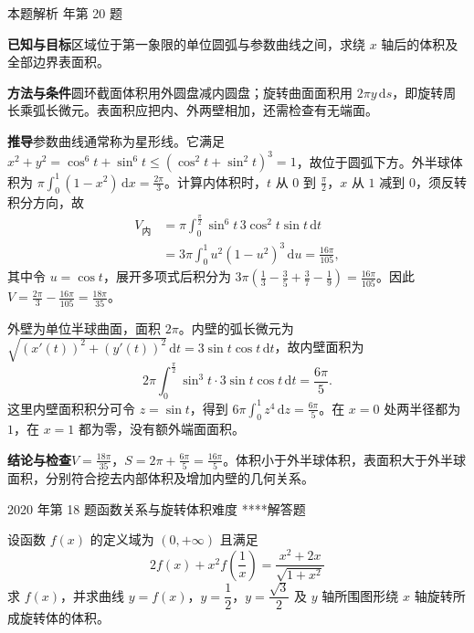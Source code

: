\documentclass[UTF8,zihao=-4,fontset=fandol]{ctexart}
\newcounter{BankQuestion}
\newcommand{\QuestionPage}[7]{%
  \stepcounter{BankQuestion}%
  \par\noindent\begin{minipage}{\linewidth}
  \raggedright
  {\small\textcolor{black!60}{#3\quad #5\quad 难度 #7}\hfill\textcolor{accent}{#2}}\par\smallskip}
\newcommand{\QuestionEnd}{\end{minipage}\par\medskip}
\newcommand{\QuestionPage}[7]{%
  \clearpage
  \stepcounter{BankQuestion}%
  {\small\textcolor{accent}{#1\hfill #2}}\par\medskip
  {\small\textcolor{black!60}{#3\quad #5\quad 难度 #7\hfill \arabic{BankQuestion} / 234}}\par\vspace{9bp}}
\newcommand{\QuestionEnd}{}
\newenvironment{QuestionSolution}[1]{%
  \clearpage
  {\small\textcolor{black!60}{本题解析\quad #1}}\par\medskip
}{\par\clearpage}
\begin{document}
\begin{QuestionSolution}{2016 年第 20 题}
\textbf{已知与目标}\quad 区域位于第一象限的单位圆弧与参数曲线之间，求绕 \(x\) 轴后的体积及全部边界表面积。

\textbf{方法与条件}\quad 圆环截面体积用外圆盘减内圆盘；旋转曲面面积用 \(2\pi y\,\mathrm{d}s\)，即旋转周长乘弧长微元。表面积应把内、外两壁相加，还需检查有无端面。

\textbf{推导}\quad 参数曲线通常称为星形线。它满足 \(x^2+y^2=\cos^6t+\sin^6t\le(\cos^2t+\sin^2t)^3=1\)，故位于圆弧下方。外半球体积为 \(\pi\int_0^1(1-x^2)\,\mathrm{d}x=\frac{2\pi}{3}\)。计算内体积时，\(t\) 从 \(0\) 到 \(\frac{\pi}{2}\)，\(x\) 从 \(1\) 减到 \(0\)，须反转积分方向，故
\[
\begin{aligned}
V_{\text{内}}
&=\pi\int_0^{\frac{\pi}{2}}\sin^6 t\,3\cos^2t\sin t\,\mathrm{d}t\\
&=3\pi\int_0^1 u^2(1-u^2)^3\,\mathrm{d}u
=\frac{16\pi}{105},
\end{aligned}
\]
其中令 \(u=\cos t\)，展开多项式后积分为 \(3\pi(\frac{1}{3}-\frac{3}{5}+\frac{3}{7}-\frac{1}{9})=\frac{16\pi}{105}\)。因此 \(V=\frac{2\pi}{3}-\frac{16\pi}{105}=\frac{18\pi}{35}\)。

外壁为单位半球曲面，面积 \(2\pi\)。内壁的弧长微元为
\(\sqrt{(x'(t))^2+(y'(t))^2}\,\mathrm{d}t=3\sin t\cos t\,\mathrm{d}t\)，故内壁面积为
\[
2\pi\int_0^{\frac{\pi}{2}}\sin^3t\cdot3\sin t\cos t\,\mathrm{d}t
=\frac{6\pi}{5}.
\]
这里内壁面积积分可令 \(z=\sin t\)，得到 \(6\pi\int_0^1z^4\,\mathrm{d}z=\frac{6\pi}{5}\)。在 \(x=0\) 处两半径都为 \(1\)，在 \(x=1\) 都为零，没有额外端面面积。

\textbf{结论与检查}\quad \(\boxed{V=\frac{18\pi}{35}}\)，\(\boxed{S=2\pi+\frac{6\pi}{5}=\frac{16\pi}{5}}\)。体积小于外半球体积，表面积大于外半球面积，分别符合挖去内部体积及增加内壁的几何关系。
\end{QuestionSolution}

\QuestionPage{3.4 定积分的应用}{解答题}{2020 年第 18 题}{3}{函数关系与旋转体积}{184 / 234}{****}
设函数 \(f\left( x \right)\) 的定义域为 \(\left( 0,+\infty \right)\) 且满足
\[2f\left( x \right)+x^{2}f\left( \dfrac{1}{x} \right)=\dfrac{x^{2}+2x}{\sqrt{1+x^{2}}}
\]
求 \(f\left( x \right)\)，并求曲线 \(y=f\left( x \right)\)，\(y=\dfrac{1}{2}\)，\(y=\dfrac{\sqrt{3}}{2}\) 及 \(y\) 轴所围图形绕 \(x\) 轴旋转所成旋转体的体积。
\QuestionEnd
\end{document}
